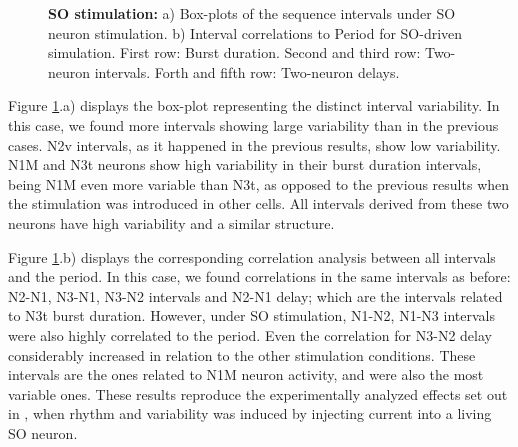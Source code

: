 \begin{figure}[hbt!]
\begin{minipage}[b]{0.53\textwidth}
\begin{minipage}[b]{\textwidth}
		\end{minipage}
	\end{minipage}
	\caption{\textbf{SO stimulation: }a) Box-plots of the sequence intervals under SO neuron stimulation. b) Interval correlations to Period for SO-driven simulation. First row: Burst duration. Second and third row: Two-neuron intervals. Forth and fifth row: Two-neuron delays.}
	\label{fig:invariant so}
\end{figure}


Figure \ref{fig:invariant so}.a) displays the box-plot representing the distinct interval variability. In this case, we found more intervals showing large variability than in the previous cases. N2v intervals, as it happened in the previous results, show low variability. %
N1M and N3t neurons show high variability in their burst duration intervals, being N1M even more variable than N3t, as opposed to the previous results when the stimulation was introduced in other cells. All intervals derived from these two neurons have high variability and a similar structure. %




Figure \ref{fig:invariant so}.b) displays the corresponding correlation analysis between all intervals and the period. %
In this case, we found correlations in the same intervals as before: N2-N1, N3-N1, N3-N2 intervals and N2-N1 delay; which are the intervals related to N3t burst duration. However, under SO stimulation,  N1-N2, N1-N3 intervals were also highly correlated to the period. Even the correlation for N3-N2 delay considerably increased in relation to the other stimulation conditions. These intervals are the ones related to N1M neuron activity, and were also the most variable ones.  These results reproduce the experimentally analyzed effects set out in \parencite{Elliott1991}, when rhythm and variability was induced by injecting current into a living SO neuron.

